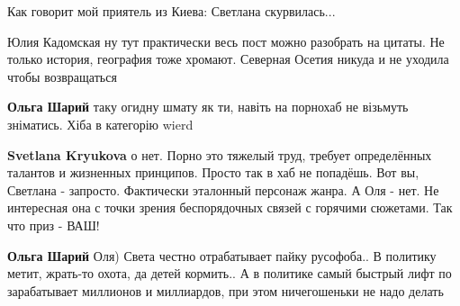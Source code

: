 \begin{itemize}
\begin{itemize}
 
Как говорит мой приятель из Киева: Светлана скурвилась...

 
Юлия Кадомская ну тут практически весь пост можно разобрать на цитаты. Не только история, география тоже хромают. Северная Осетия никуда и не уходила чтобы возвращаться

 
\textbf{Ольга Шарий} таку огидну шмату як ти, навіть на порнохаб не візьмуть зніматись. Хіба в категорію wierd

 
\textbf{Svetlana Kryukova} о нет. Порно это тяжелый труд, требует определённых талантов и жизненных принципов. Просто так в хаб не попадёшь. Вот вы, Светлана - запросто. Фактически эталонный персонаж жанра. А Оля - нет. Не интересная она с точки зрения беспорядочных связей с горячими сюжетами. Так что приз - ВАШ!

 
\textbf{Ольга Шарий} Оля) Света честно отрабатывает пайку русофоба.. В политику метит, жрать-то охота, да детей кормить.. А в политике самый быстрый лифт по зарабатывает миллионов и миллиардов, при этом ничегошеньки не надо делать

 

\end{itemize}
\end{itemize}
